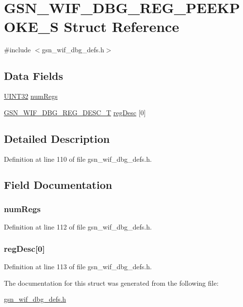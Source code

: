 \hypertarget{a00334}{
\section{GSN\_\-WIF\_\-DBG\_\-REG\_\-PEEKPOKE\_\-S Struct Reference}
\label{a00334}
}


{\ttfamily \#include $<$gsn\_\-wif\_\-dbg\_\-defs.h$>$}

\subsection*{Data Fields}
\begin{DoxyCompactItemize}
\item 
\hyperlink{a00660_gae1e6edbbc26d6fbc71a90190d0266018}{UINT32} \hyperlink{a00334_a995c03a294f8aa37020a45373a9a7383}{numRegs}
\item 
\hyperlink{a00333}{GSN\_\-WIF\_\-DBG\_\-REG\_\-DESC\_\-T} \hyperlink{a00334_aeeb806569451121cef53f00851164a05}{regDesc} \mbox{[}0\mbox{]}
\end{DoxyCompactItemize}


\subsection{Detailed Description}


Definition at line 110 of file gsn\_\-wif\_\-dbg\_\-defs.h.



\subsection{Field Documentation}
\hypertarget{a00334_a995c03a294f8aa37020a45373a9a7383}{
\subsubsection[{numRegs}]{ {\bf numRegs}}}
\label{a00334_a995c03a294f8aa37020a45373a9a7383}


Definition at line 112 of file gsn\_\-wif\_\-dbg\_\-defs.h.

\hypertarget{a00334_aeeb806569451121cef53f00851164a05}{
\subsubsection[{regDesc}]{ {\bf regDesc}\mbox{[}0\mbox{]}}}
\label{a00334_aeeb806569451121cef53f00851164a05}


Definition at line 113 of file gsn\_\-wif\_\-dbg\_\-defs.h.



The documentation for this struct was generated from the following file:\begin{DoxyCompactItemize}
\item 
\hyperlink{a00609}{gsn\_\-wif\_\-dbg\_\-defs.h}\end{DoxyCompactItemize}
